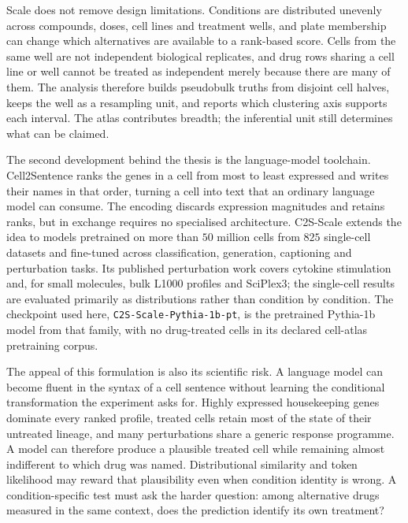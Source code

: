 Scale does not remove design limitations. Conditions are distributed unevenly across compounds,
doses, cell lines and treatment wells, and plate membership can change which alternatives are
available to a rank-based score. Cells from the same well are not independent biological
replicates, and drug rows sharing a cell line or well cannot be treated as independent merely
because there are many of them. The analysis therefore builds pseudobulk truths from disjoint cell
halves, keeps the well as a resampling unit, and reports which clustering axis supports each
interval. The atlas contributes breadth; the inferential unit still determines what can be claimed.

\begin{sloppypar}
The second development behind the thesis is the language-model toolchain. Cell2Sentence \cite{c2s}
ranks the genes in a cell from most to least expressed and writes their names in that order, turning
a cell into text that an ordinary language model can consume. The encoding discards expression
magnitudes and retains ranks, but in exchange requires no specialised architecture. C2S-Scale
\cite{c2sscale} extends the idea to models pretrained on more than $50$ million cells from $825$
single-cell datasets and fine-tuned across classification, generation, captioning and perturbation
tasks. Its published perturbation work covers cytokine stimulation and, for small molecules, bulk
L1000 profiles and SciPlex3; the single-cell results are evaluated primarily as distributions rather
than condition by condition. The checkpoint used here,
\texttt{C2S-Scale-}\allowbreak\texttt{Pythia-1b-pt}, is the
pretrained Pythia-1b model \cite{pythia} from that family, with no drug-treated cells in its declared
cell-atlas pretraining corpus.
\end{sloppypar}

The appeal of this formulation is also its scientific risk. A language model can become fluent in
the syntax of a cell sentence without learning the conditional transformation the experiment asks
for. Highly expressed housekeeping genes dominate every ranked profile, treated cells retain most
of the state of their untreated lineage, and many perturbations share a generic response programme.
A model can therefore produce a plausible treated cell while remaining almost indifferent to which
drug was named. Distributional similarity and token likelihood may reward that plausibility even
when condition identity is wrong. A condition-specific test must ask the harder question: among
alternative drugs measured in the same context, does the prediction identify its own treatment?

